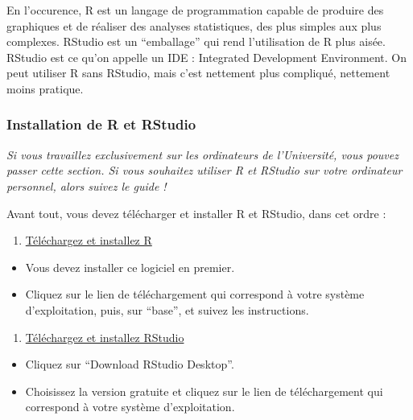 \documentclass[
  a4paper,
]{article}
\providecommand{\tightlist}{%
  \setlength{\itemsep}{0pt}\setlength{\parskip}{0pt}}
\begin{document}
En l'occurence, R est un langage de programmation capable de produire des graphiques et de réaliser des analyses statistiques, des plus simples aux plus complexes. RStudio est un ``emballage'' qui rend l'utilisation de R plus aisée. RStudio est ce qu'on appelle un IDE : Integrated Development Environment. On peut utiliser R sans RStudio, mais c'est nettement plus compliqué, nettement moins pratique.

\hypertarget{installation-de-r-et-rstudio}{%
\subsubsection{Installation de R et RStudio}\label{installation-de-r-et-rstudio}}

\emph{Si vous travaillez exclusivement sur les ordinateurs de l'Université, vous pouvez passer cette section. Si vous souhaitez utiliser R et RStudio sur votre ordinateur personnel, alors suivez le guide !}

Avant tout, vous devez télécharger et installer R et RStudio, dans cet ordre :

\begin{enumerate}
\def\labelenumi{\arabic{enumi}.}
\tightlist
\item
  \href{https://cran.r-project.org}{Téléchargez et installez R}
\end{enumerate}

\begin{itemize}
\tightlist
\item
  Vous devez installer ce logiciel en premier.
\item
  Cliquez sur le lien de téléchargement qui correspond à votre système d'exploitation, puis, sur ``base'', et suivez les instructions.
\end{itemize}

\begin{enumerate}
\def\labelenumi{\arabic{enumi}.}
\setcounter{enumi}{1}
\tightlist
\item
  \href{https://www.rstudio.com/products/RStudio/\#Desktop}{Téléchargez et installez RStudio}
\end{enumerate}

\begin{itemize}
\tightlist
\item
  Cliquez sur ``Download RStudio Desktop''.
\item
  Choisissez la version gratuite et cliquez sur le lien de téléchargement qui correspond à votre système d'exploitation.
\end{itemize}
\end{document}
